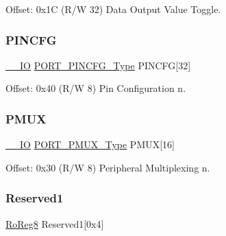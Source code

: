 Offset\+: 0x1C (R/W 32) Data Output Value Toggle. 

\mbox{\label{struct_port_group_a5bf1b629002458249752057bbc90648e}} 
\subsubsection{\texorpdfstring{PINCFG}{PINCFG}}
{\footnotesize\ttfamily \mbox{\hyperlink{core__cm0plus_8h_aec43007d9998a0a0e01faede4133d6be}{\+\_\+\+\_\+\+IO}} \mbox{\hyperlink{union_p_o_r_t___p_i_n_c_f_g___type}{P\+O\+R\+T\+\_\+\+P\+I\+N\+C\+F\+G\+\_\+\+Type}} P\+I\+N\+C\+FG\mbox{[}32\mbox{]}}



Offset\+: 0x40 (R/W 8) Pin Configuration n. 

\mbox{\label{struct_port_group_a07c536dbc789ce555370ffcfe5dabb72}} 
\subsubsection{\texorpdfstring{PMUX}{PMUX}}
{\footnotesize\ttfamily \mbox{\hyperlink{core__cm0plus_8h_aec43007d9998a0a0e01faede4133d6be}{\+\_\+\+\_\+\+IO}} \mbox{\hyperlink{union_p_o_r_t___p_m_u_x___type}{P\+O\+R\+T\+\_\+\+P\+M\+U\+X\+\_\+\+Type}} P\+M\+UX\mbox{[}16\mbox{]}}



Offset\+: 0x30 (R/W 8) Peripheral Multiplexing n. 

\mbox{\label{struct_port_group_a1106a1fe7c5fa01a183c54b4b992a7f0}} 
\subsubsection{\texorpdfstring{Reserved1}{Reserved1}}
{\footnotesize\ttfamily \mbox{\hyperlink{group___s_a_m_d21_e15_a__definitions_ga0d957f1433aaf5d70e4dc2b68288442d}{Ro\+Reg8}} Reserved1\mbox{[}0x4\mbox{]}}

\mbox{\label{struct_port_group_a1a6c9b5a2cafc18c3aa3491098ba6c2e}} 
